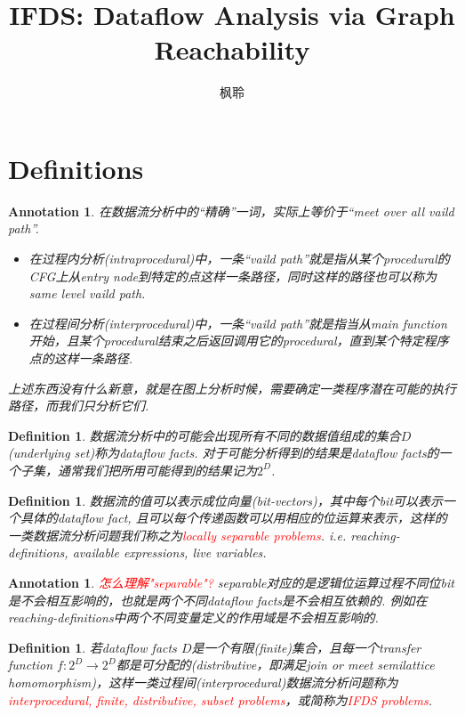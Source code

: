 \documentclass{article}
\newtheorem{definition}[theorem]{Definition}
\newtheorem{annotation}[theorem]{Annotation}
\newcommand*{\xfunc}[4]{{#2}\colon{#3}{#1}{#4}}
\newcommand*{\func}[3]{\xfunc{\to}{#1}{#2}{#3}}
\newcommand{\redt}[1]{\textcolor{red}{#1}}
\begin{document}
\title{IFDS: Dataflow Analysis via Graph Reachability}
\author{枫聆}
\maketitle
\tableofcontents

\newpage
\section{Definitions}


\begin{annotation}
\rm 在数据流分析中的“精确”一词，实际上等价于“meet over all vaild path”. 
\begin{itemize}
	\item 在过程内分析(intraprocedural)中，一条“vaild path”就是指从某个procedural的CFG上从entry node到特定的点这样一条路径，同时这样的路径也可以称为same level vaild path.  
	\item 在过程间分析(interprocedural)中，一条“vaild path”就是指当从main function开始，且某个procedural结束之后返回调用它的procedural，直到某个特定程序点的这样一条路径.  
\end{itemize}
上述东西没有什么新意，就是在图上分析时候，需要确定一类程序潜在可能的执行路径，而我们只分析它们.  
\end{annotation}

\begin{definition}
\rm 数据流分析中的可能会出现所有不同的数据值组成的集合$D$(underlying set)称为dataflow facts. 对于可能分析得到的结果是dataflow facts的一个子集，通常我们把所用可能得到的结果记为$2^D$. 
\end{definition}

\begin{definition}
\rm 数据流的值可以表示成位向量(bit-vectors)，其中每个bit可以表示一个具体的dataflow fact, 且可以每个传递函数可以用相应的位运算来表示，这样的一类数据流分析问题我们称之为\redt{locally separable problems}. i.e. reaching-definitions, available expressions, live variables. 
\end{definition}

\begin{annotation}
\rm \redt{怎么理解"separable"?} separable对应的是逻辑位运算过程不同位bit是不会相互影响的，也就是两个不同dataflow facts是不会相互依赖的. 例如在reaching-definitions中两个不同变量定义的作用域是不会相互影响的.   
\end{annotation}


\begin{definition}
\rm 若dataflow facts $D$是一个有限(finite)集合，且每一个transfer function $\func{f}{2^D}{2^D}$都是可分配的(distributive，即满足join or meet semilattice homomorphism)，这样一类过程间(interprocedural)数据流分析问题称为\redt{interprocedural, finite, distributive, subset problems}，或简称为\redt{IFDS problems}.
\end{definition}
\end{document}
